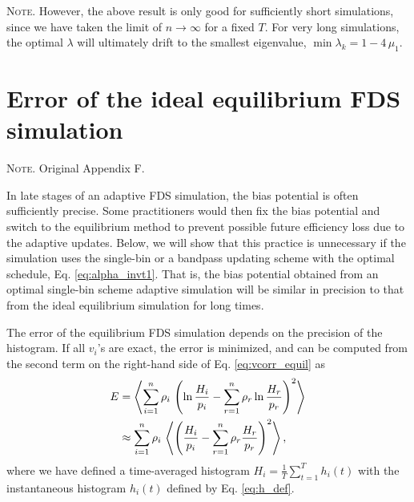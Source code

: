 \documentclass[reprint, floatfix]{revtex4-1}
\newcommand{\note}[1]{{\color{DarkGreen}\footnotesize \textsc{Note.} #1}}
\begin{document}
\note{
However, the above result %
is only good
for sufficiently short simulations,
since we have taken the limit of $n \to \infty$
for a fixed $T$.
%
For very long simulations,
the optimal $\lambda$
will ultimately drift to
the smallest eigenvalue,
$\min \lambda_k = 1 - 4 \, \mu_1$.
}







\section{\label{sec:equilerr}
Error of the ideal equilibrium FDS simulation}


\note{Original Appendix F.}


In late stages of an adaptive FDS simulation,
the bias potential is often sufficiently precise.
Some practitioners would then fix
the bias potential and switch
to the equilibrium method
to prevent possible future efficiency loss
due to the adaptive updates.
%
Below, we will show that this practice is unnecessary
if the simulation uses the single-bin or a bandpass updating scheme
with the optimal schedule, Eq. \eqref{eq:alpha_invt1}.
%
That is, the bias potential obtained from
an optimal single-bin scheme adaptive simulation
will be similar in precision to that from
the ideal equilibrium simulation
for long times.
%

The error of the equilibrium FDS simulation
depends on the precision of the histogram.
%
If all $v_i$'s are exact,
the error is minimized, and can be computed
from the second term
on the right-hand side of Eq. \eqref{eq:vcorr_equil} as
%
\begin{align}
  E
  &=
  \left\langle
    \sum_{ i = 1 }^ n
      \rho_i \,
      \left(
        \ln \frac { H_i }
                  { p_i }
        -
        \sum_{r = 1}^n \rho_r
        \ln \frac { H_r }
                  { p_r }
      \right)^2
  \right\rangle
  \notag
  \\
  &
  \approx
  \sum_{ i = 1 }^ n
    \rho_i \,
    \left\langle
      \left(
        \frac { H_i }
              { p_i }
        -
        \sum_{r = 1}^n \rho_r
            \frac { H_r }
                  { p_r }
      \right)^2
    \right\rangle,
\notag
\end{align}
where
we have defined a time-averaged histogram
$H_i = \frac{1}{T} \sum_{t = 1}^T h_i(t)$
with the instantaneous histogram
$h_i(t)$ defined by Eq. \eqref{eq:h_def}.
\end{document}
